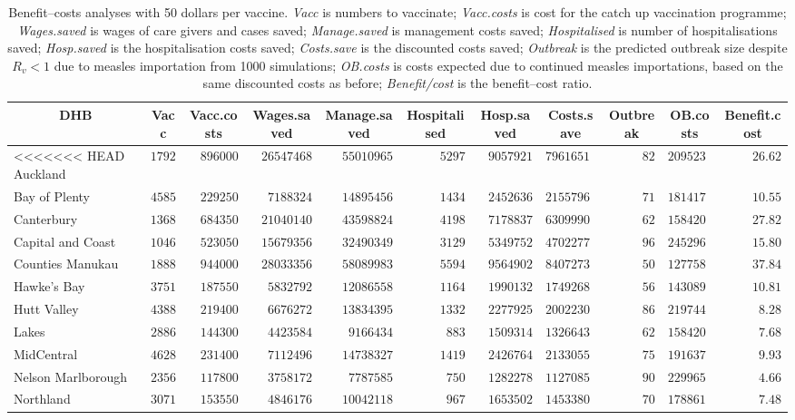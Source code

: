 \documentclass{article}
\begin{document}
\begin{itemize}
\begin{table}\small
\caption{Benefit--costs analyses with 50 dollars per vaccine. \textit{Vacc} is numbers to vaccinate; \textit{Vacc.costs} is cost for the catch up vaccination programme; \textit{Wages.saved} is wages of care givers and cases saved; \textit{Manage.saved} is management costs saved; \textit{Hospitalised} is number of hospitalisations saved; \textit{Hosp.saved} is the hospitalisation costs saved; \textit{Costs.save}  is the discounted costs saved; \textit{Outbreak}	is the predicted outbreak size despite $R_v < 1$ due to measles importation from 1000 simulations; \textit{OB.costs}	is costs expected due to continued measles importations, based on the same discounted costs as before; \textit{Benefit/cost} is the benefit--cost ratio.}
\begin{center}
\begin{tabular}{lrrrrrrrrrr}
\hline\hline
\multicolumn{1}{c}{DHB}&\multicolumn{1}{c}{Vacc}&\multicolumn{1}{c}{Vacc.costs}&\multicolumn{1}{c}{Wages.saved}&\multicolumn{1}{c}{Manage.saved}&\multicolumn{1}{c}{Hospitalised}&\multicolumn{1}{c}{Hosp.saved}&\multicolumn{1}{c}{Costs.save}&\multicolumn{1}{c}{Outbreak}&\multicolumn{1}{c}{OB.costs}&\multicolumn{1}{c}{Benefit.cost}\tabularnewline
\hline
<<<<<<< HEAD
Auckland&$17920$&$896000$&$26547468$&$55010965$&$5297$&$9057921$&$79616516$&$ 82$&$2095239$&$26.62$\tabularnewline
Bay of Plenty&$ 4585$&$229250$&$ 7188324$&$14895456$&$1434$&$2452636$&$21557962$&$ 71$&$1814170$&$10.55$\tabularnewline
Canterbury&$13687$&$684350$&$21040140$&$43598824$&$4198$&$7178837$&$63099902$&$ 62$&$1584205$&$27.82$\tabularnewline
Capital and Coast&$10461$&$523050$&$15679356$&$32490349$&$3129$&$5349752$&$47022778$&$ 96$&$2452962$&$15.80$\tabularnewline
Counties Manukau&$18880$&$944000$&$28033356$&$58089983$&$5594$&$9564902$&$84072731$&$ 50$&$1277585$&$37.84$\tabularnewline
Hawke's Bay&$ 3751$&$187550$&$ 5832792$&$12086558$&$1164$&$1990132$&$17492688$&$ 56$&$1430895$&$10.81$\tabularnewline
Hutt Valley&$ 4388$&$219400$&$ 6676272$&$13834395$&$1332$&$2277925$&$20022305$&$ 86$&$2197445$&$ 8.28$\tabularnewline
Lakes&$ 2886$&$144300$&$ 4423584$&$ 9166434$&$ 883$&$1509314$&$13266438$&$ 62$&$1584205$&$ 7.68$\tabularnewline
MidCentral&$ 4628$&$231400$&$ 7112496$&$14738327$&$1419$&$2426764$&$21330552$&$ 75$&$1916377$&$ 9.93$\tabularnewline
Nelson Marlborough&$ 2356$&$117800$&$ 3758172$&$ 7787585$&$ 750$&$1282278$&$11270851$&$ 90$&$2299652$&$ 4.66$\tabularnewline
Northland&$ 3071$&$153550$&$ 4846176$&$10042118$&$ 967$&$1653502$&$14533802$&$ 70$&$1788618$&$ 7.48$\tabularnewline

\end{tabular}
\end{center}
\end{table}
\end{itemize}
\end{document}
